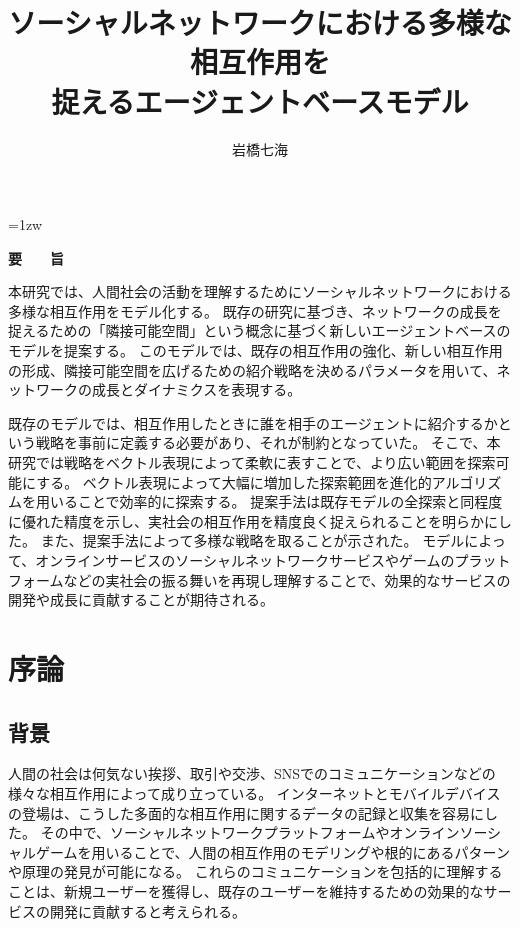 \documentclass[uplatex,11pt,openany]{ujreport}
\title{ソーシャルネットワークにおける多様な相互作用を\\捉えるエージェントベースモデル}
\author{岩橋七海}
\begin{document}
\maketitle
\thispagestyle{empty}
\newpage

\thispagestyle{empty}
\vspace*{20pt plus 1fil}
\parindent=1zw
\noindent
\begin{center}
{\Large \bf 要　　旨}
\vspace{2cm}
\end{center}
本研究では、人間社会の活動を理解するためにソーシャルネットワークにおける多様な相互作用をモデル化する。
既存の研究に基づき、ネットワークの成長を捉えるための「隣接可能空間」という概念に基づく新しいエージェントベースのモデルを提案する。
このモデルでは、既存の相互作用の強化、新しい相互作用の形成、隣接可能空間を広げるための紹介戦略を決めるパラメータを用いて、ネットワークの成長とダイナミクスを表現する。

既存のモデルでは、相互作用したときに誰を相手のエージェントに紹介するかという戦略を事前に定義する必要があり、それが制約となっていた。
そこで、本研究では戦略をベクトル表現によって柔軟に表すことで、より広い範囲を探索可能にする。
ベクトル表現によって大幅に増加した探索範囲を進化的アルゴリズムを用いることで効率的に探索する。
提案手法は既存モデルの全探索と同程度に優れた精度を示し、実社会の相互作用を精度良く捉えられることを明らかにした。
また、提案手法によって多様な戦略を取ることが示された。
モデルによって、オンラインサービスのソーシャルネットワークサービスやゲームのプラットフォームなどの実社会の振る舞いを再現し理解することで、効果的なサービスの開発や成長に貢献することが期待される。




\par
\vspace{0pt plus 1fil}
\newpage

\tableofcontents
\listoffigures

\pagebreak \setcounter{page}{1}

\chapter{序論}
    \section{背景}
    人間の社会は何気ない挨拶、取引や交渉、SNSでのコミュニケーションなどの様々な相互作用によって成り立っている。
    インターネットとモバイルデバイスの登場は、こうした多面的な相互作用に関するデータの記録と収集を容易にした。
    その中で、ソーシャルネットワークプラットフォームやオンラインソーシャルゲームを用いることで、人間の相互作用のモデリングや根的にあるパターンや原理の発見が可能になる。
    これらのコミュニケーションを包括的に理解することは、新規ユーザーを獲得し、既存のユーザーを維持するための効果的なサービスの開発に貢献すると考えられる。
\end{document}
